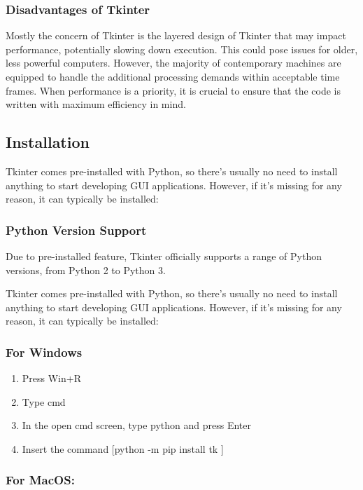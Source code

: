\subsubsection{Disadvantages of Tkinter}

Mostly the concern of Tkinter is the layered design of Tkinter that may impact performance, potentially slowing down execution. This could pose issues for older, less powerful computers. However, the majority of contemporary machines are equipped to handle the additional processing demands within acceptable time frames. When performance is a priority, it is crucial to ensure that the code is written with maximum efficiency in mind.

\subsection{Installation}

Tkinter comes pre-installed with Python, so there's usually no need to install anything to start developing GUI applications. However, if it's missing for any reason, it can typically be installed:

\subsubsection{Python Version Support}

Due to pre-installed feature, Tkinter officially supports a range of Python versions, from Python 2 to Python 3.

Tkinter comes pre-installed with Python, so there's usually no need to install anything to start developing GUI applications. However, if it's missing for any reason, it can typically be installed:

\subsubsection{For Windows}

\begin{enumerate}
    \item Press Win+R
    \item Type cmd
    \item In the open cmd screen, type python and press Enter
    \item Insert the command [python -m pip install tk
    ]
\end{enumerate}

\subsubsection{For MacOS:}


